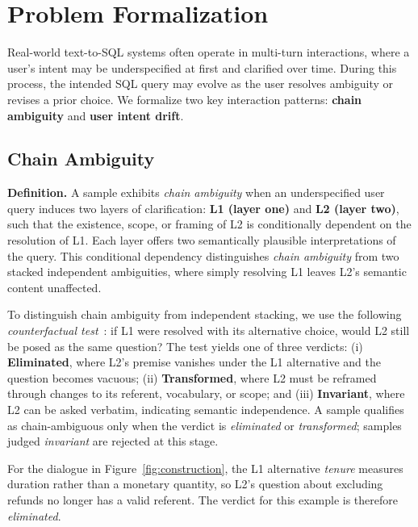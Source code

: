 \section{Problem Formalization}
\label{sec:formalization}

Real-world text-to-SQL systems often operate in multi-turn interactions, where a user's intent may be underspecified at first and clarified over time. During this process, the intended SQL query may evolve as the user resolves ambiguity or revises a prior choice. We formalize two key interaction patterns:
\textbf{chain ambiguity} and \textbf{user intent drift}.

\subsection{Chain Ambiguity}
\label{subsec:chain} 

\noindent\textbf{Definition.} A sample exhibits \emph{chain ambiguity} when an underspecified user query induces two layers of clarification: \textbf{L1 (layer one)} and \textbf{L2 (layer two)}, such that the existence, scope, or framing of L2 is conditionally dependent on the resolution of L1. Each layer offers two semantically plausible interpretations of the query. This conditional dependency distinguishes \emph{chain ambiguity} from two stacked independent ambiguities, where simply resolving L1 leaves L2's semantic content unaffected.

 To distinguish chain ambiguity from independent stacking, we use the following
\emph{counterfactual test}~\citep{pearl2009causality}: if L1 were resolved with its alternative choice, would L2 still be posed as the same question? The test yields one of three verdicts: (i) \textbf{Eliminated}, where L2's premise vanishes under the L1 alternative and the question becomes vacuous; (ii) \textbf{Transformed}, where L2 must be reframed through changes to its referent, vocabulary, or scope; and (iii) \textbf{Invariant}, where L2 can be asked verbatim, indicating semantic independence. A sample qualifies as chain-ambiguous only when the verdict is \emph{eliminated} or \emph{transformed}; samples judged \emph{invariant} are rejected at this stage.

For the dialogue in Figure~\ref{fig:construction}, the L1 alternative
\emph{tenure} measures duration rather than a monetary quantity, so L2's question about excluding refunds no longer has a valid referent. The verdict for this example is therefore \emph{eliminated}.

